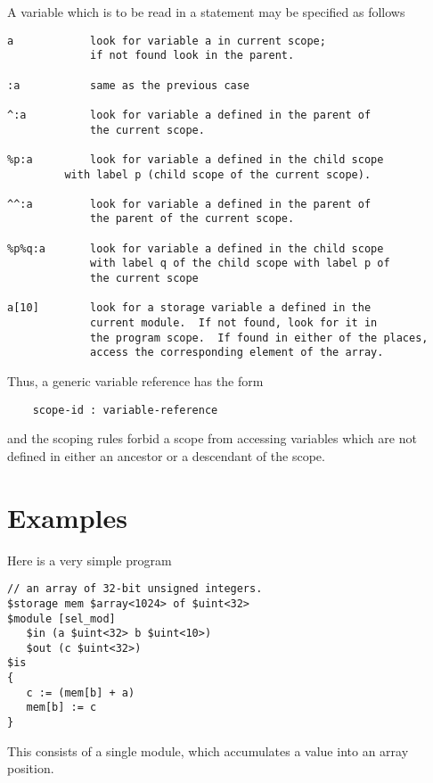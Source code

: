 \documentclass{article}
\begin{document}
A variable which is to be read in a statement may be specified 
as follows
\begin{verbatim}
a            look for variable a in current scope; 
             if not found look in the parent.

:a           same as the previous case

^:a          look for variable a defined in the parent of
             the current scope.

%p:a         look for variable a defined in the child scope 
	     with label p (child scope of the current scope).

^^:a         look for variable a defined in the parent of
             the parent of the current scope.

%p%q:a       look for variable a defined in the child scope 
             with label q of the child scope with label p of 
             the current scope

a[10]        look for a storage variable a defined in the 
             current module.  If not found, look for it in
             the program scope.  If found in either of the places,
             access the corresponding element of the array.
\end{verbatim}
Thus, a generic variable reference has the form 
\begin{verbatim} 
    scope-id : variable-reference 
\end{verbatim} 
and the scoping rules forbid a scope from accessing variables
which are not defined in either an ancestor or a descendant
of the scope.

\section{Examples}

Here is a very simple program
\begin{verbatim}
// an array of 32-bit unsigned integers.
$storage mem $array<1024> of $uint<32> 
$module [sel_mod]
   $in (a $uint<32> b $uint<10>)
   $out (c $uint<32>)
$is
{
   c := (mem[b] + a)
   mem[b] := c
}
\end{verbatim}
This consists of a single module, which accumulates
a value into an array position.
\end{document}
